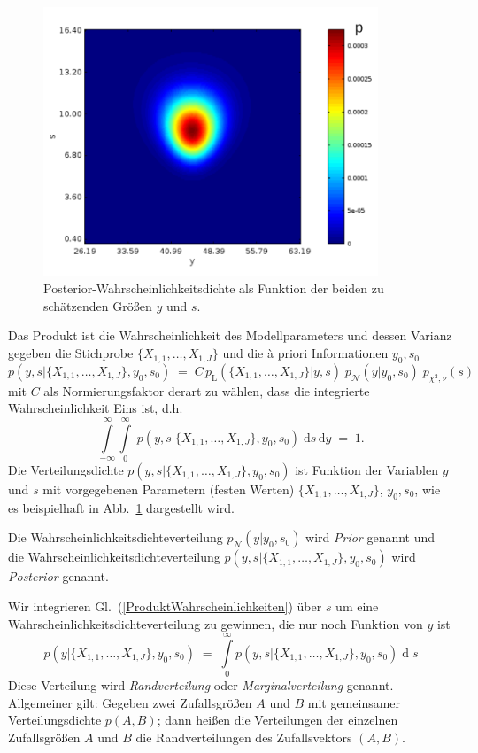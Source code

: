 \begin{figure}
\begin{center}
\includegraphics[width=100mm]{04_vorlesung/media/understand_bayes_mean_posteriormatrix.pdf}
\caption{\label{posteriormatrix} Posterior-Wahrscheinlichkeitsdichte als Funktion
der beiden zu schätzenden Größen $y$ und $s$.}
\end{center}
\end{figure}
Das Produkt ist die Wahrscheinlichkeit des Modellparameters und dessen Varianz gegeben
die Stichprobe $\{X_{1,1}, \dots, X_{1,J}\}$ und die {\`a} priori Informationen $y_0, s_0$
\begin{equation}
p(y, s | \{X_{1,1}, \dots, X_{1,J}\}, y_0, s_0) \; = \; C \,
p_\mathrm{L}(\{X_{1,1}, \dots, X_{1,J}\} | y, s) \; p_\mathcal{N}(y | y_0, s_0) \; p_{\chi^2,\nu}(s)
\label{ProduktWahrscheinlichkeiten}
\end{equation}
mit $C$ als Normierungsfaktor derart zu wählen, dass die integrierte Wahrscheinlichkeit Eins ist, d.h.
$$
\int\limits_{-\infty}^\infty  \int\limits_0^\infty \; p(y, s | \{X_{1,1}, \dots, X_{1,J}\}, y_0, s_0) \;
\mathrm{d}s \, \mathrm{d}y \; = \; 1 .
$$
Die Verteilungsdichte $p(y, s | \{X_{1,1}, \dots, X_{1,J}\}, y_0, s_0)$ ist Funktion der
Variablen $y$ und $s$ mit vorgegebenen Parametern 
(festen Werten) $\{X_{1,1}, \dots, X_{1,J}\}$, $y_0, s_0$, wie es beispielhaft in 
Abb.~\ref{posteriormatrix} dargestellt wird.

Die Wahrscheinlichkeitsdichteverteilung
$p_\mathcal{N}(y | y_0, s_0)$ wird \textsl{Prior} genannt und die
Wahr\-schein\-lich\-keits\-dichte\-ver\-teilung $p(y, s | \{X_{1,1}, \dots, X_{1,J}\}, y_0, s_0)$
wird \textsl{Posterior} genannt.

Wir integrieren Gl.~(\ref{ProduktWahrscheinlichkeiten}) über $s$ um eine 
Wahrscheinlichkeits\-dichte\-verteilung zu gewinnen, die nur noch Funktion von $y$ ist
\begin{equation}
p(y | \{X_{1,1}, \dots, X_{1,J}\}, y_0, s_0)  \; = \;
\int\limits_0^\infty p(y, s | \{X_{1,1}, \dots, X_{1,J}\}, y_0, s_0) \operatorname{d}s
\label{RandverteilungPosterior}
\end{equation}
Diese Verteilung wird \textsl{Randverteilung} oder \textsl{Marginalverteilung} genannt.
Allgemeiner gilt: Gegeben zwei Zufallsgrößen $A$ und $B$ mit gemeinsamer Verteilungsdichte
$p(A, B)$; dann heißen die Verteilungen der einzelnen Zufallsgrößen
$A$ und $B$ die Randverteilungen des Zufallsvektors $(A, B)$.

